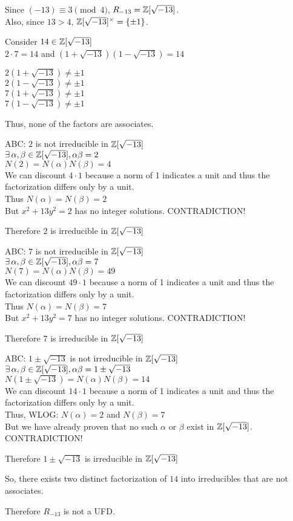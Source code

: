 \documentclass[letterpaper,12pt,fleqn]{article}
\renewcommand{\a}{\alpha}
\renewcommand{\b}{\beta}
\newcommand{\x}{\times}
\begin{document}
\begin{enumerate}
  Since $(-13)\equiv3\pmod4$, $R_{-13}=\mathbb{Z}[\sqrt{-13}]$. \\
  Also, since $13>4$, $\Z[\sqrt{-13}]^{\x}=\{\pm1\}$.
  
  Consider $14\in\mathbb{Z}[\sqrt{-13}]$ \\
  $2\cdot7=14$ and $(1+\sqrt{-13})(1-\sqrt{-13})=14$

  $2(1+\sqrt{-13})\ne\pm1$ \\
  $2(1-\sqrt{-13})\ne\pm1$ \\
  $7(1+\sqrt{-13})\ne\pm1$ \\
  $7(1-\sqrt{-13})\ne\pm1$

  Thus, none of the factors are associates.

  ABC: $2$ is not irreducible in $\mathbb{Z}[\sqrt{-13}]$ \\
  $\exists\,\a,\b\in\Z[\sqrt{-13}],\a\b=2$ \\
  $N(2)=N(\a)N(\b)=4$ \\
  We can discount $4\cdot1$ because a norm of 1 indicates a unit and thus the
  factorization differs only by a unit. \\
  Thus $N(\a)=N(\b)=2$ \\
  But $x^2+13y^2=2$ has no integer solutions.
  CONTRADICTION!

  Therefore $2$ is irreducible in $\mathbb{Z}[\sqrt{-13}]$

  ABC: $7$ is not irreducible in $\mathbb{Z}[\sqrt{-13}]$ \\
  $\exists\,\a,\b\in\Z[\sqrt{-13}],\a\b=7$ \\
  $N(7)=N(\a)N(\b)=49$ \\
  We can discount $49\cdot1$ because a norm of 1 indicates a unit and thus the
  factorization differs only by a unit. \\
  Thus $N(\a)=N(\b)=7$ \\
  But $x^2+13y^2=7$ has no integer solutions.
  CONTRADICTION!

  Therefore $7$ is irreducible in $\mathbb{Z}[\sqrt{-13}]$

  ABC: $1\pm\sqrt{-13}$ is not irreducible in $\mathbb{Z}[\sqrt{-13}]$ \\
  $\exists\,\a,\b\in\Z[\sqrt{-13}],\a\b=1\pm\sqrt{-13}$ \\
  $N(1\pm\sqrt{-13})=N(\a)N(\b)=14$ \\
  We can discount $14\cdot1$ because a norm of 1 indicates a unit and thus the
  factorization differs only by a unit. \\
  Thus, WLOG: $N(\a)=2$ and $N(\b)=7$ \\
  But we have already proven that no such $\a$ or $\b$ exist in
  $\mathbb{Z}[\sqrt{-13}]$. \\
  CONTRADICTION!

  Therefore $1\pm\sqrt{-13}$ is irreducible in $\mathbb{Z}[\sqrt{-13}]$

  So, there exists two distinct factorization of $14$ into irreducibles that
  are not associates.

  Therefore $R_{-13}$ is not a UFD.
\end{enumerate}
\end{document}
